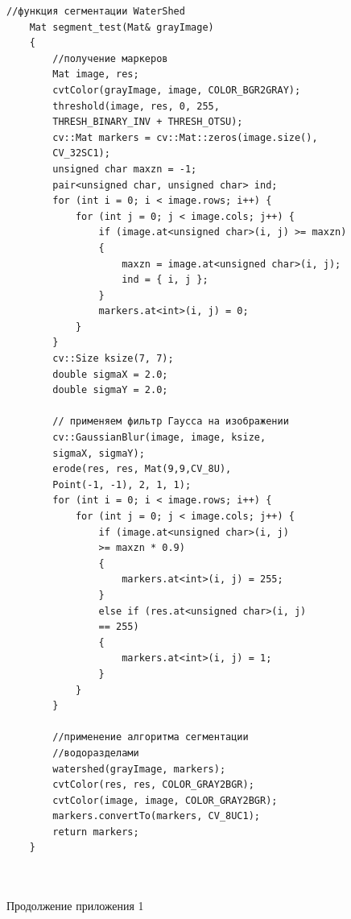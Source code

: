 \documentclass[14pt, a4paper]{extreport}
\begin{document}
\begin{Verbatim}[fontseries=c, fontsize=\fontsize{10pt}{12pt}\selectfont]
	//функция сегментации WaterShed
	Mat segment_test(Mat& grayImage)
	{
		//получение маркеров
		Mat image, res;
		cvtColor(grayImage, image, COLOR_BGR2GRAY);
		threshold(image, res, 0, 255, 
		THRESH_BINARY_INV + THRESH_OTSU);
		cv::Mat markers = cv::Mat::zeros(image.size(), 
		CV_32SC1);
		unsigned char maxzn = -1;
		pair<unsigned char, unsigned char> ind;
		for (int i = 0; i < image.rows; i++) {
			for (int j = 0; j < image.cols; j++) {
				if (image.at<unsigned char>(i, j) >= maxzn)
				{
					maxzn = image.at<unsigned char>(i, j);
					ind = { i, j };
				}
				markers.at<int>(i, j) = 0;
			}
		}
		cv::Size ksize(7, 7);
		double sigmaX = 2.0;
		double sigmaY = 2.0;
		
		// применяем фильтр Гаусса на изображении
		cv::GaussianBlur(image, image, ksize, 
		sigmaX, sigmaY);
		erode(res, res, Mat(9,9,CV_8U), 
		Point(-1, -1), 2, 1, 1);
		for (int i = 0; i < image.rows; i++) {
			for (int j = 0; j < image.cols; j++) {
				if (image.at<unsigned char>(i, j) 
				>= maxzn * 0.9)
				{
					markers.at<int>(i, j) = 255;
				}
				else if (res.at<unsigned char>(i, j)
				== 255)
				{
					markers.at<int>(i, j) = 1;
				}
			}
		}
		
		//применение алгоритма сегментации
		//водоразделами
		watershed(grayImage, markers);
		cvtColor(res, res, COLOR_GRAY2BGR);
		cvtColor(image, image, COLOR_GRAY2BGR);
		markers.convertTo(markers, CV_8UC1);
		return markers;
	}
	
	
\end{Verbatim}
\begin{flushright} \noindent Продолжение приложения 1 \end{flushright}
\end{document}
